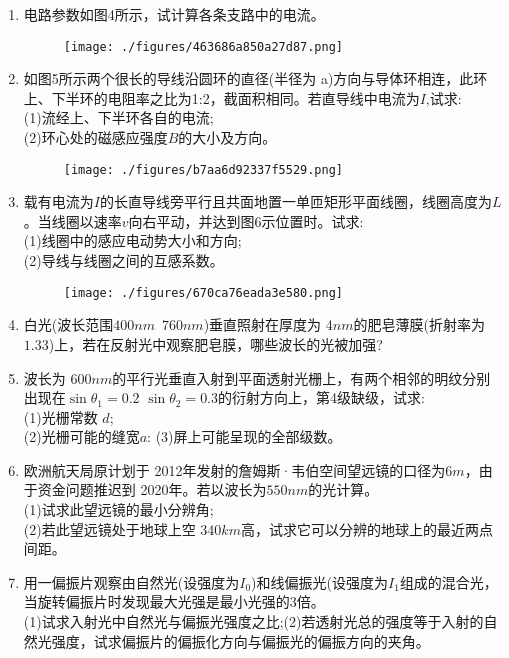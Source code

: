 \begin{enumerate}
\begin{figure}[ht]
\caption{} \label{fig_SD15_1}
\end{figure}
\item 电路参数如图4所示，试计算各条支路中的电流。
\begin{figure}[ht]
\centering
\texttt{[image: ./figures/463686a850a27d87.png]}
\caption{} \label{fig_SD15_4}
\end{figure}
\item 如图5所示两个很长的导线沿圆环的直径(半径为 a)方向与导体环相连，此环上、下半环的电阻率之比为1:2，截面积相同。若直导线中电流为$I$,试求:\\
(1)流经上、下半环各自的电流;\\
(2)环心处的磁感应强度$ B$的大小及方向。
\begin{figure}[ht]
\centering
\texttt{[image: ./figures/b7aa6d92337f5529.png]}
\caption{} \label{fig_SD15_5}
\end{figure}
\item 载有电流为$I$的长直导线旁平行且共面地置一单匝矩形平面线圈，线圈高度为$L$。当线圈以速率$v$向右平动，并达到图6示位置时。试求:\\
(1)线圈中的感应电动势大小和方向;\\
(2)导线与线圈之间的互感系数。
\begin{figure}[ht]
\centering
\texttt{[image: ./figures/670ca76eada3e580.png]}
\caption{} \label{fig_SD15_6}
\end{figure}
\item 白光(波长范围$400nm$~$760nm$)垂直照射在厚度为 $4nm $的肥皂薄膜(折射率为$1.33$)上，若在反射光中观察肥皂膜，哪些波长的光被加强?
\item 波长为 $600nm $的平行光垂直入射到平面透射光栅上，有两个相邻的明纹分别出现在$\sin \theta_1=0.2$ $\sin \theta_2=0.3$的衍射方向上，第4级缺级，试求:\\
(1)光栅常数 $d$;\\
(2)光栅可能的缝宽$a$:
(3)屏上可能呈现的全部级数。
\item 欧洲航天局原计划于 2012年发射的詹姆斯·韦伯空间望远镜的口径为$ 6m$，由于资金问题推迟到 2020年。若以波长为$550nm$的光计算。\\
(1)试求此望远镜的最小分辨角;\\
(2)若此望远镜处于地球上空 $340km $高，试求它可以分辨的地球上的最近两点间距。
\item 用一偏振片观察由自然光(设强度为$I_0$)和线偏振光(设强度为$I_1$组成的混合光，当旋转偏振片时发现最大光强是最小光强的3倍。\\
(1)试求入射光中自然光与偏振光强度之比;(2)若透射光总的强度等于入射的自然光强度，试求偏振片的偏振化方向与偏振光的偏振方向的夹角。
\end{enumerate}